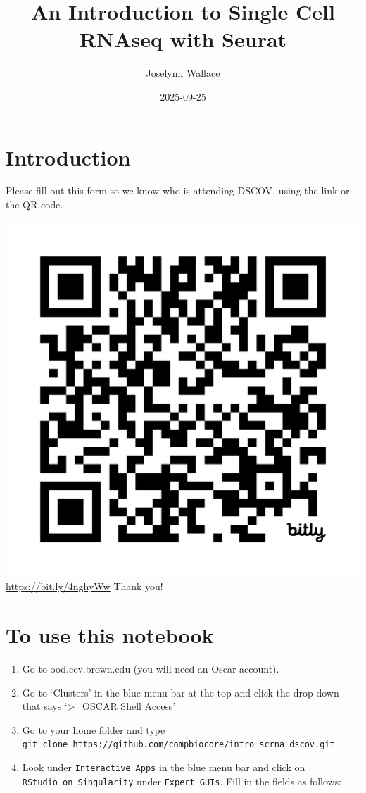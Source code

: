 \documentclass[
  letterpaper,
  DIV=11,
  numbers=noendperiod]{scrreprt}
\title{An Introduction to Single Cell RNAseq with Seurat}
\author{Joselynn Wallace}
\date{2025-09-25}
\providecommand{\tightlist}{%
  \setlength{\itemsep}{0pt}\setlength{\parskip}{0pt}}
\renewcommand*\contentsname{Table of contents}
\newcommand\contentsname{Table of contents}
\begin{document}
\maketitle

\renewcommand*\contentsname{Table of contents}
{
\hypersetup{linkcolor=}
\setcounter{tocdepth}{2}
\tableofcontents
}


\chapter{Introduction}\label{introduction}

Please fill out this form so we know who is attending DSCOV, using the
link or the QR code.

\includegraphics[width=0.5\linewidth,height=\textheight,keepaspectratio]{image/DSCoVAttendanceForm.png}
\href{https://docs.google.com/forms/d/e/1FAIpQLSeyXnwcBBgzT8C2o9p4DkupVaQDLNIx7lIvyoyOUgW_YIdsHA/viewform?pli=1}{https://bit.ly/4nghyWw}
Thank you!


\chapter{To use this notebook}\label{to-use-this-notebook}

\begin{enumerate}
\def\labelenumi{\arabic{enumi}.}
\tightlist
\item
  Go to ood.ccv.brown.edu (you will need an Oscar account).
\item
  Go to `Clusters' in the blue menu bar at the top and click the
  drop-down that says `\textgreater\_OSCAR Shell Access'
\item
  Go to your home folder and type
  \texttt{git\ clone\ https://github.com/compbiocore/intro\_scrna\_dscov.git}
\item
  Look under \texttt{Interactive\ Apps} in the blue menu bar and click
  on \texttt{RStudio\ on\ Singularity} under \texttt{Expert\ GUIs}. Fill
  in the fields as follows:
\end{enumerate}
\end{document}
